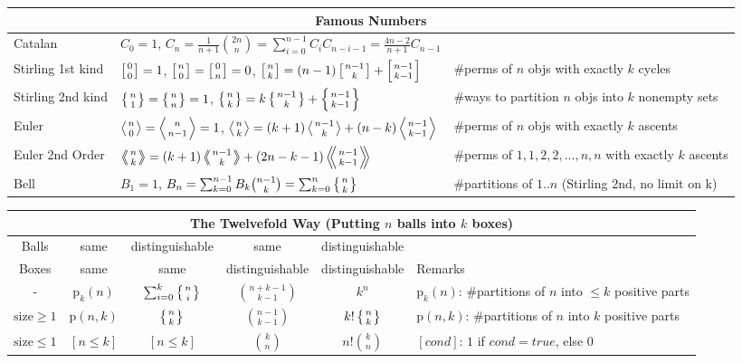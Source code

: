 \begin{center}
\begin{tabular}{@{}l|l|l@{}}
\toprule
\multicolumn{3}{c}{Famous Numbers} \\ \midrule

Catalan	&	$C_0=1$, $C_n=\frac{1}{n+1}\binom{2n}{n} = \sum_{i=0}^{n-1}C_iC_{n-i-1} = \frac{4n-2}{n+1}C_{n-1}$  & \\
Stirling 1st kind & $\left[{0\atop 0}\right]=1$, $\left[{n\atop 0}\right]=\left[{0\atop n}\right]=0$, $\left[{n\atop k}\right]=(n-1)\left[{n-1\atop k}\right]+\left[{n-1\atop k-1}\right]$ & \#perms of $n$ objs with exactly $k$ cycles\\
Stirling 2nd kind & $\left\{{n\atop 1}\right\}=\left\{{n\atop n}\right\}=1$, $\left\{{n\atop k}\right\} = k \left\{{ n-1 \atop k }\right\} + \left\{{n-1\atop k-1}\right\}$ & \#ways to partition $n$ objs into $k$ nonempty sets\\
Euler	& $\left \langle {n\atop 0} \right \rangle = \left \langle {n\atop n-1} \right \rangle = 1 $, $\left \langle {n\atop k} \right \rangle = (k+1) \left \langle {n-1\atop {k}} \right \rangle + (n-k)\left \langle {{n-1}\atop {k-1}} \right \rangle$ & \#perms of $n$ objs with exactly $k$ ascents \\
Euler 2nd Order &  $\left \langle \!\!\left \langle {n\atop k} \right \rangle \!\! \right \rangle = (k+1) \left \langle \!\! \left \langle {{n-1}\atop {k}} \right \rangle \!\! \right \rangle +(2n-k-1)\left \langle \!\! \left \langle {{n-1}\atop {k-1}} \right \rangle  \!\! \right \rangle$ & \#perms of ${1,1,2,2,...,n,n}$ with exactly $k$ ascents \\
Bell & $B_1 = 1$, $B_n = \sum_{k=0}^{n-1} B_k \binom{n-1}{k} = \sum_{k=0}^n\left\{{n\atop k}\right\}$ & \#partitions of $1..n$ (Stirling 2nd, no limit on k)\\

\bottomrule
\end{tabular}
\end{center}

\begin{tabular}{@{}c|c|c|c|c|l@{}}
\toprule
\multicolumn{6}{c}{The Twelvefold Way (Putting $n$ balls into $k$ boxes)} \\ \hline
Balls & same & distinguishable & same & distinguishable & \\
Boxes & same & same & distinguishable & distinguishable & Remarks\\
\hline
- & $\mathrm{p}_k(n)$ & $\sum_{i=0}^k \left\{{n\atop i}\right\}$ & $\binom{n+k-1}{k-1}$ & $k^n$ & $\mathrm{p}_k(n)$: \#partitions of $n$ into $\le k$ positive parts \\
$\mathrm{size}\ge 1$ & $\mathrm{p}(n,k)$ & $\left\{{n\atop k}\right\}$ & $\binom{n-1}{k-1}$ & $k!\left\{{n\atop k}\right\}$ & $\mathrm{p}(n,k)$: \#partitions of $n$ into $k$ positive parts \\
$\mathrm{size}\le 1$ & $[n \le k]$ & $[n \le k]$ & $\binom{k}{n}$ & $n!\binom{k}{n}$ & $[cond]$: $1$ if $cond=true$, else $0$\\


\bottomrule
\end{tabular}

